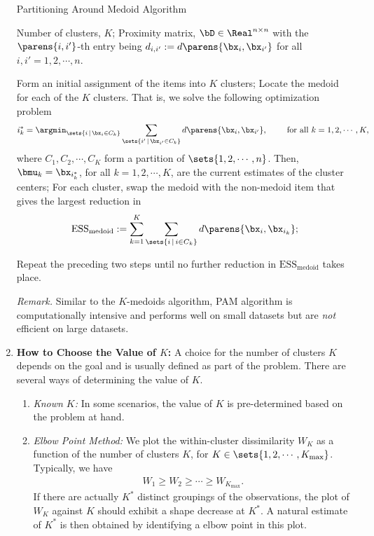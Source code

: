 \documentclass[12pt]{article}
\begin{document}
\begin{enumerate}[label=\textbf{\arabic*.}]
    \begin{minipage}{\linewidth}
		\begin{algorithm}[H]
			\caption{Partitioning Around Medoid Algorithm}\label{algo-pam}
			\begin{algorithmic}[1]
				\REQUIRE Number of clusters, $K$; 
				\REQUIRE Proximity matrix, $\bD \in \Real^{n \times n}$ with the $\parens{i, i'}$-th entry being $d_{i, i'} := d \parens{\bx_i, \bx_{i'}}$ for all $i, i' = 1, 2, \cdots, n$. 
				
				\STATE Form an initial assignment of the items into $K$ clusters; 
				\STATE Locate the medoid for each of the $K$ clusters. That is, we solve the following optimization problem 
					\begin{align*}
						i_k^* = \argmin_{\sets{i \,\vert\, \bx_i \in C_k}} \sum_{\sets{i' \,\vert\, \bx_{i'} \in C_k}} d \parens{\bx_i, \bx_{i'}}, \qquad \text{ for all } k = 1, 2, \cdots, K, 
					\end{align*}
					where $C_1, C_2, \cdots, C_K$ form a partition of $\sets{1, 2, \cdots, n}$. Then, $\bmu_k = \bx_{i_k^*}$, for all $k = 1, 2, \cdots, K$, are the current estimates of the cluster centers; 
				\STATE For each cluster, swap the medoid with the non-medoid item that gives the largest reduction in 
				\begin{align*}
					\mathrm{ESS}_{\mathrm{medoid}} := \sum_{k=1}^K \sum_{\sets{i \,\vert\, i \in C_k}} d \parens{\bx_i, \bx_{i_k}}; 
				\end{align*}
				
				\STATE Repeat the preceding two steps until no further reduction in $\mathrm{ESS}_{\mathrm{medoid}}$ takes place. 
			\end{algorithmic}
		\end{algorithm}
	\end{minipage}
	
	\textit{Remark.} Similar to the $K$-medoids algorithm, PAM algorithm is computationally intensive and performs well on small datasets but are \emph{not} efficient on large datasets. 
	
	\item \textbf{How to Choose the Value of $K$:} A choice for the number of clusters $K$ depends on the goal and is usually defined as part of the problem. There are several ways of determining the value of $K$. 
	\begin{enumerate}
		\item \textit{Known $K$:} In some scenarios, the value of $K$ is pre-determined based on the problem at hand. 
		\item \textit{Elbow Point Method:} We plot the within-cluster dissimilarity $W_K$ as a function of the number of clusters $K$, for $K \in \sets{1, 2, \cdots, K_{\max}}$. Typically, we have 
		\begin{align*}
			W_1 \ge W_2 \ge \cdots \ge W_{K_{\max}}. 
		\end{align*}
		If there are actually $K^*$ distinct groupings of the observations, the plot of $W_K$ against $K$ should exhibit a shape decrease at $K^*$. A natural estimate of $K^*$ is then obtained by identifying a elbow point in this plot. 
		

\end{enumerate}
\end{enumerate}
\end{document}
